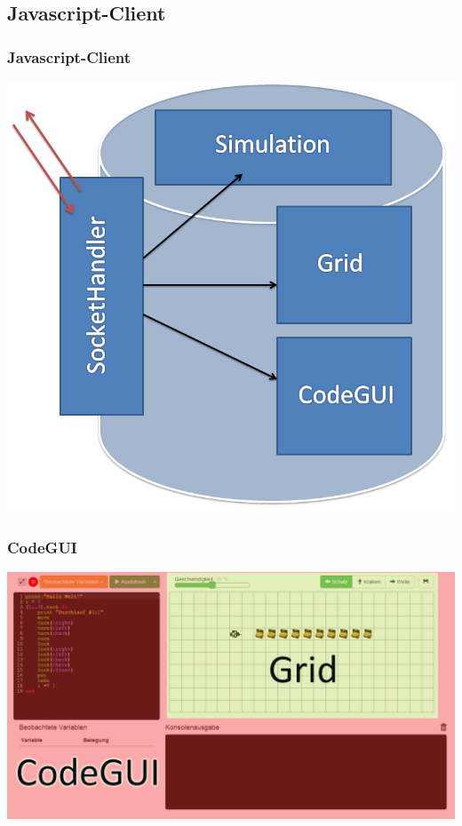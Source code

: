 \subsection{Javascript-Client}

\begin{frame}
\frametitle{Javascript-Client}
\begin{center}
	\includegraphics[scale=0.3]{client/modules.png}
\end{center}
\end{frame}

\begin{frame}
\frametitle{CodeGUI}
\begin{center}
	\includegraphics[scale=0.35]{client/client-markiert.png}
\end{center}
\end{frame}

